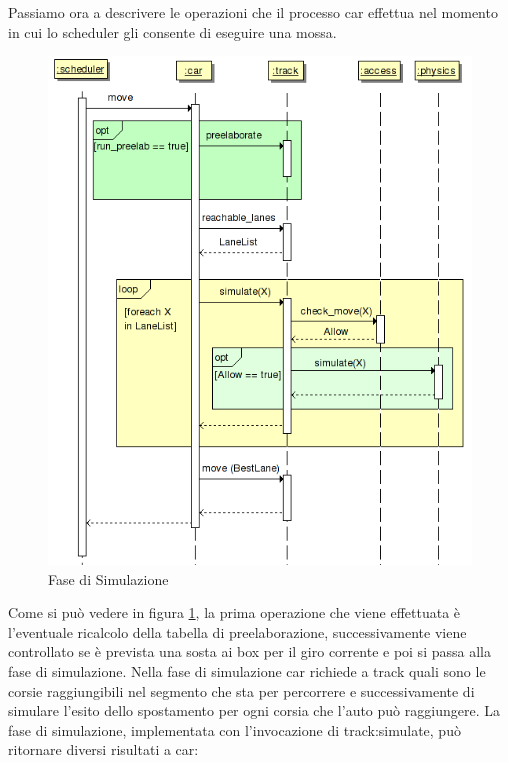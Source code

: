 \documentclass[11pt,a4paper]{report}
\begin{document}
Passiamo ora a descrivere le operazioni che il processo car effettua nel momento in cui lo scheduler gli consente di eseguire una mossa.
\begin{figure}
\includegraphics[width=\textwidth]{diagrammi/Simulation}
\caption{Fase di Simulazione}
\label{fig:simulation}
\end{figure}
Come si può vedere in figura \ref{fig:simulation}, la prima operazione che viene effettuata è l'eventuale ricalcolo della tabella di preelaborazione, successivamente viene controllato se è prevista una sosta ai box per il giro corrente e poi si passa alla fase di simulazione.
Nella fase di simulazione car richiede a track quali sono le corsie raggiungibili nel segmento che sta per percorrere e successivamente di simulare l'esito dello spostamento per ogni corsia che l'auto può raggiungere.
La fase di simulazione, implementata con l'invocazione di track:simulate, può ritornare diversi risultati a car:
\end{document}
